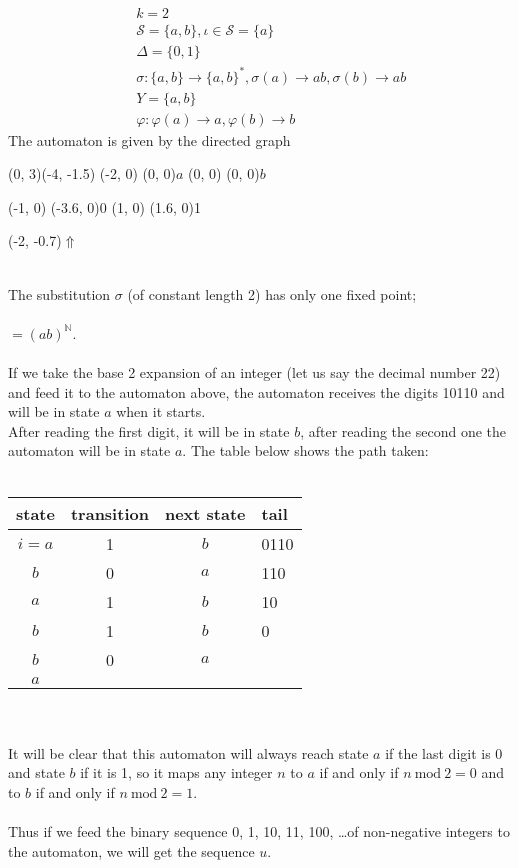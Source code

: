 \documentclass{article}
\begin{document}
\begin{example} \label{ex:abstar}
\begin{eqnarray*}
&&k = 2\\
&&\mathcal{S} = \{a, b\}, \iota \in \mathcal{S} = \{a\}\\
&&\Delta = \{0, 1\}\\
&&\sigma:\{a, b\} \to \{a, b\}^*, \sigma(a) \to ab,
\sigma(b) \to ab\\
&&Y = \{a, b\}\\
&&\varphi: \varphi(a) \to a, \varphi(b) \to b
\end{eqnarray*}
The automaton is given by the directed graph\\
\begin{graph}(0, 3)(-4, -1.5)
  (-2, 0) (0, 0){$a$}
  (0, 0)  (0, 0){$b$}

  (-1, 0) \freetext(-3.6, 0){0}
   
   
  (1, 0) \freetext(1.6, 0){1}

  \freetext(-2, -0.7){$\Uparrow$}
\end{graph}\\
The substitution $\sigma$ (of constant length 2) has only one fixed point;\\
\\
$= (ab)^\mathbb{N}$.\\
\\
If we take the base 2 expansion of an integer (let us say the decimal
number 22) and feed it to the automaton above, the automaton receives the
digits 10110 and will be in state $a$ when it starts.\\
After reading the first digit, it will be in state $b$, after reading the
second one the automaton will be in state $a$. The table below shows the path
taken:\\
\\
\begin{tabular}{c|c|c|l}
state & transition & next state & tail\\
\hline
$i=a$ & 1 & $b$ & 0110\\
$b$   & 0 & $a$ & 110\\
$a$   & 1 & $b$ & 10\\
$b$   & 1 & $b$ & 0\\
$b$   & 0 & $a$ &\\
$a$   &   &   &
\end{tabular}\\
\\
It will be clear that this automaton will always reach state $a$ if the last 
digit is 0 and state $b$ if it is 1, so it maps any integer $n$ to $a$ if and 
only if $n \mathrm{\ mod\ } 2 = 0$ and to $b$ if and only if 
$n \mathrm{\ mod\ } 2 = 1$.\\
\\
Thus if we feed the binary sequence 0, 1, 10, 11, 100, \ldots of non-negative 
integers to the automaton, we will get the sequence $u$.
\end{example}
\end{document}
